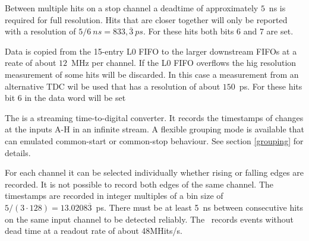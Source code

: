 {    Between multiple hits on a stop channel a deadtime of approximately $5$~ns is required for full resolution. 
    Hits that are closer together will only be reported with a resolution of $5/6~ns = 833,\overline{3}~ps$. For these hits both bits 6 and 7 are set.

    Data is copied from the 15-entry L0 FIFO to the larger downstream FIFOs at a reate of about $12$~MHz per channel. 
    If the L0 FIFO overflows the hig resolution measurement of some hits will be discarded. 
    In this case a measurement from an alternative TDC wil be used that has a resolution of about $150$~ps. 
    For these hits bit 6 in the data word will be set
} { %
    The \deviceName is a streaming time-to-digital converter. It records the timestamps of changes at the inputs A-H in an infinite stream. 
    A flexible grouping mode is available that can emulated common-start or common-stop behaviour. See section \ref{grouping} for details.

    For each channel it can be selected individually whether rising or falling edges are recorded. It is not possible to record both edges of the same channel. 
    The timestamps are recorded in integer multiples of a bin size of $5/(3\cdot 128) = 13.0208\overline{3}$~ps. 
    There must be at least 5~ns between consecutive hits on the same input channel to be detected reliably. 
    The \deviceName\ records events without dead time at a readout rate of about 48MHits/s.
}